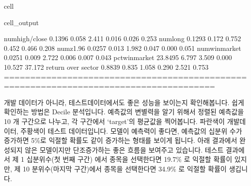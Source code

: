 \documentclass[letterpaper,10pt,english]{jupyterBook}
\begin{document}
\begin{sphinxuseclass}{cell}
\begin{sphinxVerbatimOutput}
\begin{sphinxuseclass}{cell_output}
\begin{sphinxVerbatim}[commandchars=\\\{\}]
num\PYGZus{}high/close         0.1396      0.058      2.411      0.016       0.026       0.253
num\PYGZus{}long              \PYGZhy{}0.1293      0.172     \PYGZhy{}0.752      0.452      \PYGZhy{}0.466       0.208
num\PYGZus{}z\PYGZgt{}1.96             0.0257      0.013      1.982      0.047       0.000       0.051
num\PYGZus{}win\PYGZus{}market         0.0251      0.009      2.722      0.006       0.007       0.043
pct\PYGZus{}win\PYGZus{}market        23.8495      6.797      3.509      0.000      10.527      37.172
return over sector    \PYGZhy{}0.8839      0.835     \PYGZhy{}1.058      0.290      \PYGZhy{}2.521       0.753
======================================================================================
\end{sphinxVerbatim}

\end{sphinxuseclass}\end{sphinxVerbatimOutput}

\end{sphinxuseclass}
\sphinxAtStartPar
 개발 데이터가 아니라, 테스트데이터에서도 좋은 성능을 보이는지 확인해봅니다. 쉽게 확인하는 방법은 Decile 분석입니다. 예측값의 변별력을 알기 위해서 정렬된 예측값을 10 개 구간으로 나누고, 각 구간에서 ‘target’의 평균값을 찍어봅니다. 파란색이 개발데이터, 주황색이 테스트 데이터입니다. 모델이 예측력이 좋다면, 예측값의 십분위 수가 증가하면 5\%로 익절할 확률도 같이 증가하는 형태를 보이게 됩니다. 아래 결과에서 완성되지 않은 모델이지만 단조증가하는 좋은 흐름을 보여주고 있습니다. 테스트 결과에서 제 1 십분위수(첫 번째 구간) 에서 종목을 선택한다면 19.7\% 로 익절할 확률이 있지만, 제 10 분위수(마지막 구간)에서 종목을 선택한다면 34.9\% 로 익절할 확률이 생깁니다.
\end{document}
